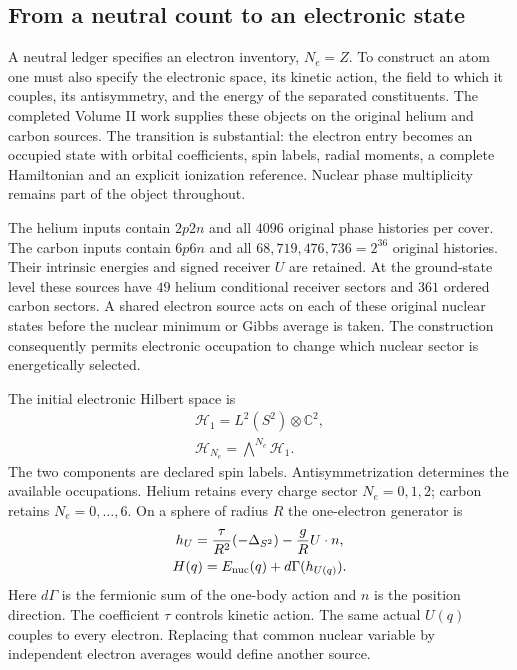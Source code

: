 
\subsection{From a neutral count to an electronic state}

A neutral ledger specifies an electron inventory, $N_e=Z$. To construct an atom one must also specify the electronic space, its kinetic action, the field to which it couples, its antisymmetry, and the energy of the separated constituents. The completed Volume II work supplies these objects on the original helium and carbon sources. The transition is substantial: the electron entry becomes an occupied state with orbital coefficients, spin labels, radial moments, a complete Hamiltonian and an explicit ionization reference. Nuclear phase multiplicity remains part of the object throughout.

The helium inputs contain $2p2n$ and all $4096$ original phase histories per cover. The carbon inputs contain $6p6n$ and all $68{,}719{,}476{,}736=2^{36}$ original histories. Their intrinsic energies and signed receiver $U$ are retained. At the ground-state level these sources have $49$ helium conditional receiver sectors and $361$ ordered carbon sectors. A shared electron source acts on each of these original nuclear states before the nuclear minimum or Gibbs average is taken. The construction consequently permits electronic occupation to change which nuclear sector is energetically selected. 

The initial electronic Hilbert space is
\[
\begin{gathered}
\mathcal H_1=L^2(S^2)\otimes\mathbb C^2,
 \\
 \mathcal H_{N_e}=\bigwedge^{N_e}\mathcal H_1.
\end{gathered}
\]
The two components are declared spin labels. Antisymmetrization determines the available occupations. Helium retains every charge sector $N_e=0,1,2$; carbon retains $N_e=0,\ldots,6$. On a sphere of radius $R$ the one-electron generator is
\[
\begin{gathered}
h_U=\frac{\tau}{R^2}(-\Delta_{S^2})-\frac gR U\cdot n,
 \\
 H(q)=E_{\rm nuc}(q)+d\Gamma(h_{U(q)}).
\end{gathered}
\]
Here $d\Gamma$ is the fermionic sum of the one-body action and $n$ is the position direction. The coefficient $\tau$ controls kinetic action. The same actual $U(q)$ couples to every electron. Replacing that common nuclear variable by independent electron averages would define another source.

